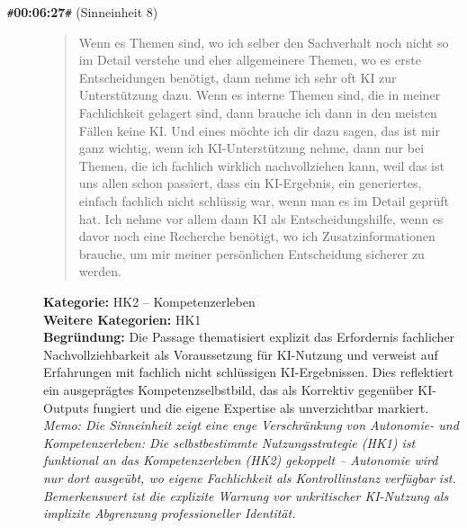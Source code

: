 \begin{description}
  \item[\texttt{\#}\textbf{00:06:27}\texttt{\#} (Sinneinheit 8)]
  \begin{quote}
  Wenn es Themen sind, wo ich selber den Sachverhalt noch nicht so im Detail verstehe und eher allgemeinere Themen, wo es erste Entscheidungen benötigt, dann nehme ich sehr oft KI zur Unterstützung dazu. Wenn es interne Themen sind, die in meiner Fachlichkeit gelagert sind, dann brauche ich dann in den meisten Fällen keine KI. Und eines möchte ich dir dazu sagen, das ist mir ganz wichtig, wenn ich KI-Unterstützung nehme, dann nur bei Themen, die ich fachlich wirklich nachvollziehen kann, weil das ist uns allen schon passiert, dass ein KI-Ergebnis, ein generiertes, einfach fachlich nicht schlüssig war, wenn man es im Detail geprüft hat. Ich nehme vor allem dann KI als Entscheidungshilfe, wenn es davor noch eine Recherche benötigt, wo ich Zusatzinformationen brauche, um mir meiner persönlichen Entscheidung sicherer zu werden.
  \end{quote}
  \textbf{Kategorie:} HK2 -- Kompetenzerleben\\
  \textbf{Weitere Kategorien:} HK1\\
  \textbf{Begr\"undung:} Die Passage thematisiert explizit das Erfordernis fachlicher Nachvollziehbarkeit als Voraussetzung für KI-Nutzung und verweist auf Erfahrungen mit fachlich nicht schlüssigen KI-Ergebnissen. Dies reflektiert ein ausgeprägtes Kompetenzselbstbild, das als Korrektiv gegenüber KI-Outputs fungiert und die eigene Expertise als unverzichtbar markiert.
  \\\textit{Memo: Die Sinneinheit zeigt eine enge Verschränkung von Autonomie- und Kompetenzerleben: Die selbstbestimmte Nutzungsstrategie (HK1) ist funktional an das Kompetenzerleben (HK2) gekoppelt – Autonomie wird nur dort ausgeübt, wo eigene Fachlichkeit als Kontrollinstanz verfügbar ist. Bemerkenswert ist die explizite Warnung vor unkritischer KI-Nutzung als implizite Abgrenzung professioneller Identität.}
\end{description}
\medskip

